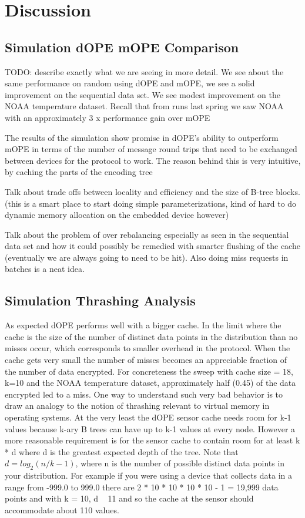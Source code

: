 \documentclass[12pt]{article}
\begin{document}
\section{Discussion}
\subsection{Simulation dOPE mOPE Comparison}
TODO: describe exactly what we are seeing in more detail.  We see about the same performance on random using dOPE and mOPE, we see a solid improvement on the sequential data set.  We see modest improvement on the NOAA temperature dataset.  Recall that from runs last spring we saw NOAA with an approximately 3 x performance gain over mOPE

The results of the simulation show promise in dOPE's ability to outperform mOPE in terms of the number of message round trips that need to be exchanged between devices for the protocol to work.  The reason behind this is very intuitive, by caching the parts of the encoding tree 

Talk about trade offs between locality and efficiency and the size of B-tree blocks.  (this is a smart place to start doing simple parameterizations, kind of hard to do dynamic memory allocation on the embedded device however)

Talk about the problem of over rebalancing especially as seen in the sequential data set and how it could possibly be remedied with smarter flushing of the cache (eventually we are always going to need to be hit).  Also doing miss requests in batches is a neat idea.

\subsection{Simulation Thrashing Analysis}
As expected dOPE performs well with a bigger cache.  In the limit where the cache is the size of the number of distinct data points in the distribution than no misses occur, which corresponds to smaller overhead in the protocol.  When the cache gets very small the number of misses becomes an appreciable fraction of the number of data encrypted.  For concreteness the sweep with cache size = 18, k=10 and the NOAA temperature dataset, approximately half (0.45) of the data encrypted led to a miss.  One way to understand such very bad behavior is to draw an analogy to the notion of thrashing relevant to virtual memory in operating systems.  At the very least the dOPE sensor cache needs room for k-1 values because k-ary B trees can have up to k-1 values at every node.  However a more reasonable requirement is for the sensor cache to contain room for at least k * d where d is the greatest expected depth of the tree.  Note that $d = log_2(n / k -1)$, where n is the number of possible distinct data points in your distribution.  For example if you were using a device that collects data in a range from -999.0 to 999.0 there are 2 * 10 * 10 * 10 * 10 - 1 = 19,999 data points and with k = 10, d ~ 11 and so the cache at the sensor should accommodate about 110 values.
\end{document}
